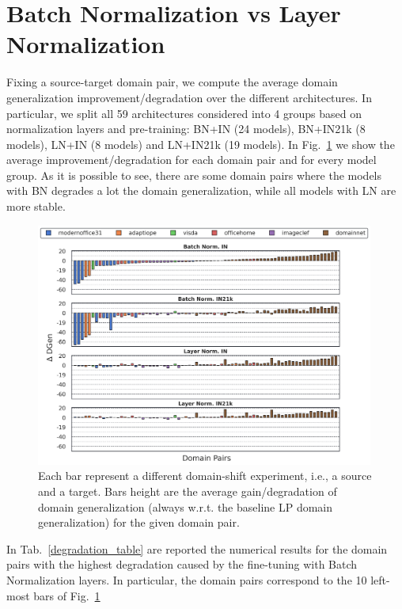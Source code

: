 \documentclass{article}
\begin{document}
\clearpage

\section{Batch Normalization vs Layer Normalization}
\label{app_ln_vs_bn}

Fixing a source-target domain pair, we compute the average domain generalization improvement/degradation over the different architectures. In particular, we split all 59 architectures considered into 4 groups based on normalization layers and pre-training: BN+IN (24 models), BN+IN21k (8 models), LN+IN (8 models) and LN+IN21k (19 models).
In Fig.~\ref{domains_bn_ln} we show the average improvement/degradation for each domain pair and for every model group. As it is possible to see, there are some domain pairs where the models with BN degrades a lot the domain generalization, while all models with LN are more stable.

\begin{figure}[h!]
\begin{center}
\includegraphics[width=0.99\textwidth]{images/domains.png}
\end{center}
\caption{Each bar represent a different domain-shift experiment, i.e., a source and a target. Bars height are the average gain/degradation of domain generalization (always w.r.t. the baseline LP domain generalization) for the given domain pair.}
\label{domains_bn_ln}
\end{figure}

In Tab.~\ref{degradation_table} are reported the numerical results for the domain pairs with the highest degradation caused by the fine-tuning with Batch Normalization layers. In particular, the domain pairs correspond to the 10 left-most bars of Fig.~\ref{domains_bn_ln}
\end{document}
